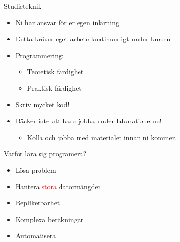 \documentclass[
  10pt,
  ignorenonframetext,
]{beamer}
\providecommand{\tightlist}{%
  \setlength{\itemsep}{0pt}\setlength{\parskip}{0pt}}
\begin{document}
\begin{frame}{Studieteknik}
\protect\hypertarget{studieteknik}{}
\begin{itemize}
\tightlist
\item
  Ni har ansvar för er egen inlärning
\item
  Detta kräver eget arbete kontinuerligt under kursen
\item
  Programmering:

  \begin{itemize}
  \tightlist
  \item
    Teoretisk färdighet
  \item
    Praktisk färdighet
  \end{itemize}
\item
  Skriv mycket kod!
\item
  Räcker inte att bara jobba under laborationerna!

  \begin{itemize}
  \tightlist
  \item
    Kolla och jobba med materialet innan ni kommer.
  \end{itemize}
\end{itemize}
\end{frame}

\begin{frame}{Varför lära sig programera?}
\protect\hypertarget{varfuxf6r-luxe4ra-sig-programera}{}
\begin{itemize}[<+->]
\tightlist
\item
  Lösa problem
\item
  Hantera \textcolor{red}{stora} datormängder
\item
  Replikerbarhet
\item
  Komplexa beräkningar
\item
  Automatisera
\end{itemize}
\end{frame}
\end{document}
